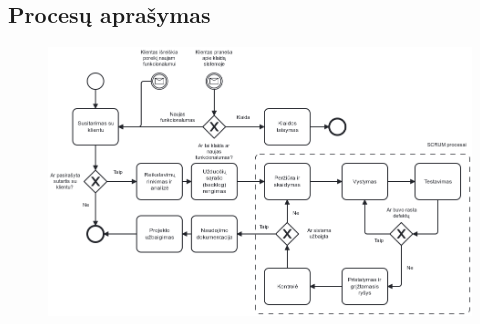 



\begin{landscape}
\section{Procesų aprašymas}
\thispagestyle{empty}
\begin{figure}[H]%
    \centering
    \includegraphics[width=\linewidth]{etc/diagram.png}
\end{figure}
\end{landscape}

